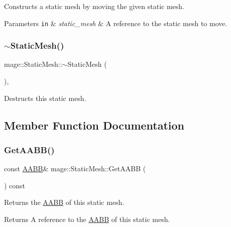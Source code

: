 Constructs a static mesh by moving the given static mesh.


\begin{DoxyParams}[1]{Parameters}
\mbox{\tt in}  & {\em static\+\_\+mesh} & A reference to the static mesh to move. \\
\hline
\end{DoxyParams}
\hypertarget{classmage_1_1_static_mesh_a7fbae949f631d29913193a1b2c2ef658}{}\label{classmage_1_1_static_mesh_a7fbae949f631d29913193a1b2c2ef658} 
\subsubsection{\texorpdfstring{$\sim$\+Static\+Mesh()}{~StaticMesh()}}
{\footnotesize\ttfamily mage\+::\+Static\+Mesh\+::$\sim$\+Static\+Mesh (\begin{DoxyParamCaption}{ }\end{DoxyParamCaption})\hspace{0.3cm}{\ttfamily [virtual]}, {\ttfamily [default]}}

Destructs this static mesh. 

\subsection{Member Function Documentation}
\hypertarget{classmage_1_1_static_mesh_aaf793aaeccd66c2b1b172f2847db86ed}{}\label{classmage_1_1_static_mesh_aaf793aaeccd66c2b1b172f2847db86ed} 
\subsubsection{\texorpdfstring{Get\+A\+A\+B\+B()}{GetAABB()}}
{\footnotesize\ttfamily const \hyperlink{structmage_1_1_a_a_b_b}{A\+A\+BB}\& mage\+::\+Static\+Mesh\+::\+Get\+A\+A\+BB (\begin{DoxyParamCaption}{ }\end{DoxyParamCaption}) const\hspace{0.3cm}{\ttfamily [noexcept]}}

Returns the \hyperlink{structmage_1_1_a_a_b_b}{A\+A\+BB} of this static mesh.

\begin{DoxyReturn}{Returns}
A reference to the \hyperlink{structmage_1_1_a_a_b_b}{A\+A\+BB} of this static mesh. 
\end{DoxyReturn}
\hypertarget{classmage_1_1_static_mesh_a007a31e6630f5095af7f1e468f12912f}{}\label{classmage_1_1_static_mesh_a007a31e6630f5095af7f1e468f12912f} 
